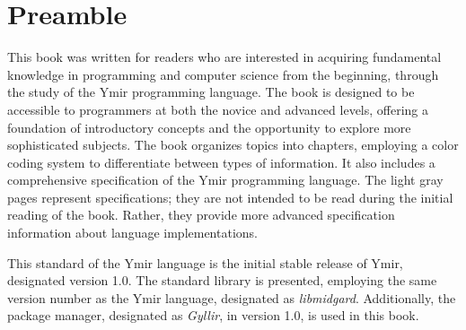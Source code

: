 \chapter*{Preamble}
\label{chap:preamble}

This book was written for readers who are interested in acquiring fundamental
knowledge in programming and computer science from the beginning, through the
study of the Ymir programming language. The book is designed to be accessible to
programmers at both the novice and advanced levels, offering a foundation of
introductory concepts and the opportunity to explore more sophisticated
subjects. The book organizes topics into chapters, employing a color coding
system to differentiate between types of information. It also includes a
comprehensive specification of the Ymir programming language. The light gray
pages represent specifications; they are not intended to be read during the
initial reading of the book. Rather, they provide more advanced specification
information about language implementations.

This standard of the Ymir language is the initial stable release of Ymir,
designated version 1.0. The standard library is presented, employing the same
version number as the Ymir language, designated as \textit{libmidgard}.
Additionally, the package manager, designated as \textit{Gyllir}, in version
1.0, is used in this book.
